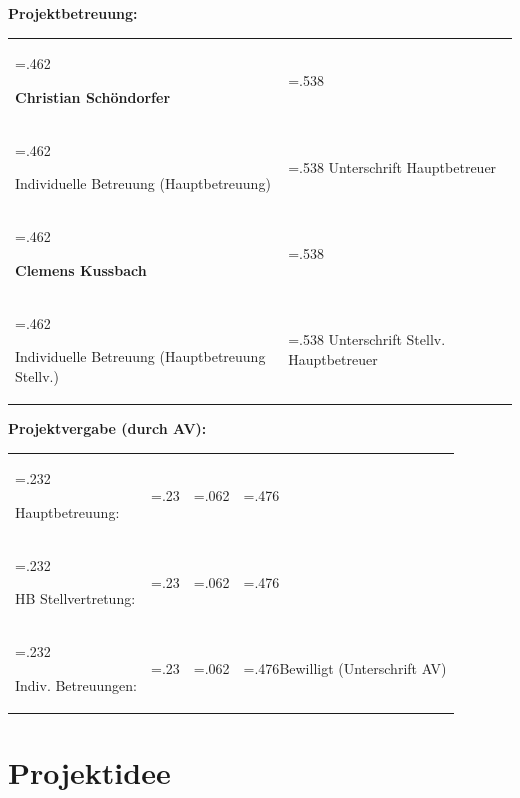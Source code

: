 \documentclass[
	headings=optiontotocandhead,%
	oneside,
	numbers=noenddot,%
	toc=flat, %
	10pt, %
	parskip=full, %
	listof=totoc, %
	listof=flat, %
	numbers=noenddot, %
	bibliography=totoc, %
	a4paper,DIV=14,
]{scrartcl}
\begin{document}
\large{\textbf{Projektbetreuung:}}
\begin{table}[h]
\begin{tabularx} {\textwidth} {
	|>{\hsize=.462\hsize}X
	|>{\hsize=.538\hsize}X|
}

\hline
\rule{0pt}{28pt}	\large{\textbf{Christian Schöndorfer}}	&              \\
\rule{0pt}{11pt}\textcolor[HTML]{A6A6A6}{\footnotesize{Individuelle Betreuung (Hauptbetreuung)}}	&	\textcolor[HTML]{A6A6A6}{\footnotesize{Unterschrift Hauptbetreuer}}	\\ \hline
\rule{0pt}{28pt}	\large{\textbf{Clemens Kussbach}}	&              \\
\rule{0pt}{11pt}\textcolor[HTML]{A6A6A6}{\footnotesize{Individuelle Betreuung (Hauptbetreuung Stellv.)}}	&	\textcolor[HTML]{A6A6A6}{\footnotesize{Unterschrift Stellv. Hauptbetreuer}}	\\ \hline
\end{tabularx}
\end{table}


\large{\textbf{\textcolor[HTML]{A6A6A6}{Projektvergabe (durch AV):}}}

\begin{table}[h]
\begin{tabularx} {\textwidth} {
	|>{\hsize=.232\hsize}X
	|>{\hsize=.23\hsize}X
	|>{\hsize=.062\hsize}X
	|>{\hsize=.476\hsize}X|
}

\cline{1-2} \cline{4-4}
\rule{0pt}{17pt}\normalsize{\textcolor[HTML]{808080}{Hauptbetreuung:}}&&&\\ \cline{1-2}
\rule{0pt}{17pt}\normalsize{\textcolor[HTML]{808080}{HB Stellvertretung:}}&&&\\ \cline{1-2}
\rule{0pt}{17pt}\normalsize{\textcolor[HTML]{808080}{Indiv. Betreuungen:}}&&&\footnotesize{\textcolor[HTML]{808080}{Bewilligt (Unterschrift AV)}}\\ \cline{1-2} \cline{4-4}
\end{tabularx}
\end{table}

\newpage

\tableofcontents
\newpage

\section{Projektidee}
\end{document}
